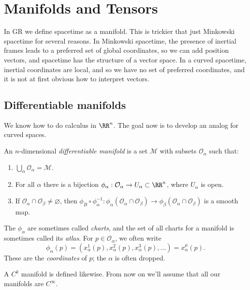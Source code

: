 \documentclass{jknotes}
\begin{document}
\section{Manifolds and Tensors}

In GR we define spacetime as a manifold. This is trickier that just Minkowski spacetime for several reasons. In Minkowski spacetime, the presence of inertial frames leads to a preferred set of global coordinates, so we can add position vectors, and spacetime has the structure of a vector space. In a curved spacetime, inertial coordinates are local, and so we have no set of preferred coordinates, and it is not at first obvious how to interpret vectors.

\subsection{Differentiable manifolds}
We know how to do calculus in \(\RR^n\). The goal now is to develop an analog for curved spaces.

\begin{defn}
    An \(n\)-dimensional \emph{differentiable manifold} is a set \(\mathcal{M}\) with subsets \(\mathcal{O}_\alpha\) such that:
    \begin{enumerate}
        \item \(\bigcup_\alpha\mathcal{O}_\alpha=\mathcal{M}\).
        \item For all \(\alpha\) there is a bijection \(\phi_\alpha:\mathcal{O}_\alpha\to U_\alpha \subset\RR^n\), where \(U_\alpha\) is open.
        \item If \(\mathcal{O}_\alpha\cap\mathcal{O}_\beta \ne \varnothing\), then \(\phi_B\circ\phi_\alpha^{-1}:\phi_\alpha(\mathcal{O}_\alpha\cap\mathcal{O}_\beta) \to \phi_\beta(\mathcal{O}_\alpha\cap\mathcal{O}_\beta)\) is a smooth map. 
    \end{enumerate}
\end{defn}

The \(\phi_\alpha\) are sometimes called \emph{charts}, and the set of all charts for a manifold is sometimes called its \emph{atlas}. For \(p\in\mathcal{O}_\alpha\), we often write
\begin{equation}
    \phi_\alpha(p) = (x^1_\alpha(p),x_\alpha^2(p),x_\alpha^3(p),\dots) = x_\alpha^\mu(p).
\end{equation}
These are the \emph{coordinates} of \(p\); the \(\alpha\) is often dropped. 

A \(C^k\) manifold is defined likewise. From now on we'll assume that all our manifolds are \(C^\infty\).
\end{document}

